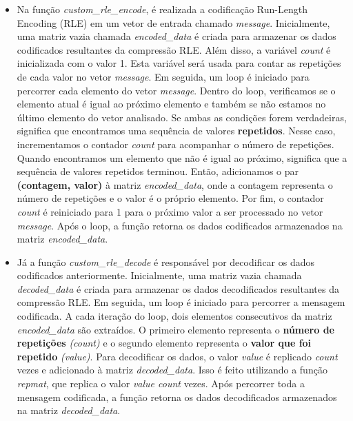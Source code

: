 \documentclass{article}
\begin{document}
\begin{itemize}
    \item Na função \textit{custom\_rle\_encode}, é realizada a codificação Run-Length Encoding (RLE) em um vetor de entrada chamado \textit{message}. Inicialmente, uma matriz vazia chamada \textit{encoded\_data} é criada para armazenar os dados codificados resultantes da compressão RLE. Além disso, a variável \textit{count} é inicializada com o valor 1. Esta variável será usada para contar as repetições de cada valor no vetor \textit{message}.
    Em seguida, um loop é iniciado para percorrer cada elemento do vetor \textit{message}. Dentro do loop, verificamos se o elemento atual é igual ao próximo elemento e também se não estamos no último elemento do vetor analisado. Se ambas as condições forem verdadeiras, significa que encontramos uma sequência de valores \textbf{repetidos}. Nesse caso, incrementamos o contador \textit{count} para acompanhar o número de repetições.
    Quando encontramos um elemento que não é igual ao próximo, significa que a sequência de valores repetidos terminou. Então, adicionamos o par \textbf{(contagem, valor)} à matriz \textit{encoded\_data}, onde a contagem representa o número de repetições e o valor é o próprio elemento. Por fim, o contador \textit{count} é reiniciado para 1 para o próximo valor a ser processado no vetor \textit{message}. Após o loop, a função retorna os dados codificados armazenados na matriz \textit{encoded\_data}.

    \item Já a função \textit{custom\_rle\_decode} é responsável por decodificar os dados codificados anteriormente. Inicialmente, uma matriz vazia chamada \textit{decoded\_data} é criada para armazenar os dados decodificados resultantes da compressão RLE.
    Em seguida, um loop é iniciado para percorrer a mensagem codificada. A cada iteração do loop, dois elementos consecutivos da matriz \textit{encoded\_data} são extraídos. O primeiro elemento representa o \textbf{número de repetições} \textit{(count)} e o segundo elemento representa o \textbf{valor que foi repetido} \textit{(value)}.
    Para decodificar os dados, o valor \textit{value} é replicado \textit{count} vezes e adicionado à matriz \textit{decoded\_data}. Isso é feito utilizando a função \textit{repmat}, que replica o valor \textit{value count} vezes.
    Após percorrer toda a mensagem codificada, a função retorna os dados decodificados armazenados na matriz \textit{decoded\_data}.
\end{itemize}
\end{document}
